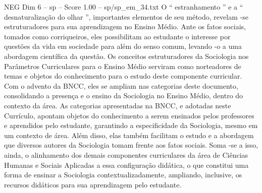 \begin{textsample}{NEG Dim 6 – sp – Score 1.00 – sp/sp\_em\_34.txt}
O “ estranhamento ” e a “ desnaturalização do olhar ”, importantes elementos de seu método, revelam -se estruturadores para sua aprendizagem no Ensino Médio.
Ante os fatos sociais, tomados como corriqueiros, eles possibilitam ao estudante o interesse por questões da vida em sociedade para além do senso comum, levando -o a uma abordagem científica da questão.
Os conceitos estruturadores da Sociologia nos Parâmetros Curriculares para o Ensino Médio serviram como norteadores de temas e objetos do conhecimento para o estudo deste componente curricular.
Com o advento da BNCC, eles se ampliam nas categorias deste documento, consolidando a presença e o ensino da Sociologia no Ensino Médio, dentro do contexto da área.
As categorias apresentadas na BNCC, e adotadas neste Currículo, apontam objetos do conhecimento a serem ensinados pelos professores e aprendidos pelo estudante, garantindo a especificidade da Sociologia, mesmo em um contexto de área.
Além disso, elas também facilitam o estudo e a abordagem que diversos autores da Sociologia tomam frente aos fatos sociais.
Soma -se a isso, ainda, o alinhamento dos demais componentes curriculares da área de Ciências Humanas e Sociais Aplicadas a essa configuração didática, o que constitui uma forma de ensinar a Sociologia contextualizadamente, ampliando, inclusive, os recursos didáticos para sua aprendizagem pelo estudante.

\end{textsample}
